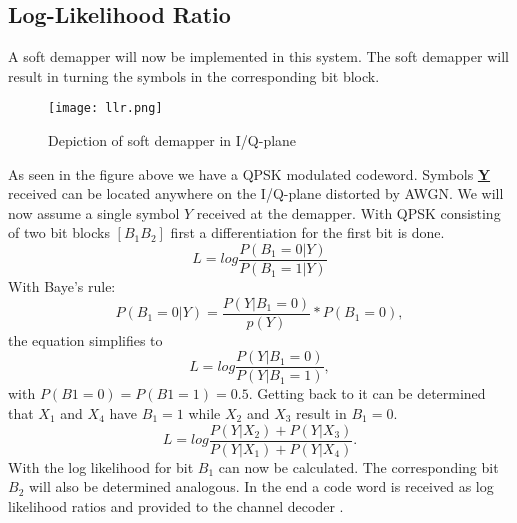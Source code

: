 \subsection{Log-Likelihood Ratio}
A soft demapper will now be implemented in this system. The soft demapper will result in turning the symbols in the corresponding bit block.
\begin{figure}[!htb]
    \centering
    \texttt{[image: llr.png]}
    \caption{Depiction of soft demapper in I/Q-plane}
    \label{fig:llr}
\end{figure}
\newline
As seen in the figure above we have a \gls{QPSK} modulated codeword. Symbols \textbf{\underline{Y}} received can be located anywhere on the I/Q-plane distorted by AWGN. We will now assume a single symbol $Y$ received at the demapper.
With QPSK consisting of two bit blocks $[B_1B_2]$ first a differentiation for the first bit is done.
\begin{equation}
\label{eq:llr1}
L = log\frac{P(B_1=0|Y)}{P(B_1=1|Y)}
\end{equation}
With Baye's rule:
\begin{equation}
\label{eq:bl}
P(B_1=0|Y) = \frac{P(Y|B_1=0)}{p(Y)}*P(B_1=0),
\end{equation}
the equation simplifies to 
\begin{equation}
L = log\frac{P(Y|B_1=0)}{P(Y|B_1=1)},
\end{equation}
with $P(B1=0)=P(B1=1)=0.5$.
Getting back to  it can be determined that $X_1$ and $X_4$ have $B_1=1$ while $X_2$ and $X_3$ result in $B_1=0$.
\begin{equation}
L = log\frac{P(Y|X_2)+P(Y|X_3)}{P(Y|X_1)+P(Y|X_4)}.
\end{equation}
With  the log likelihood for bit $B_1$ can now be calculated. The corresponding bit $B_2$ will also be determined analogous. In the end a code word is received as log likelihood ratios and provided to the channel decoder \cite{SoftDemapping}.
